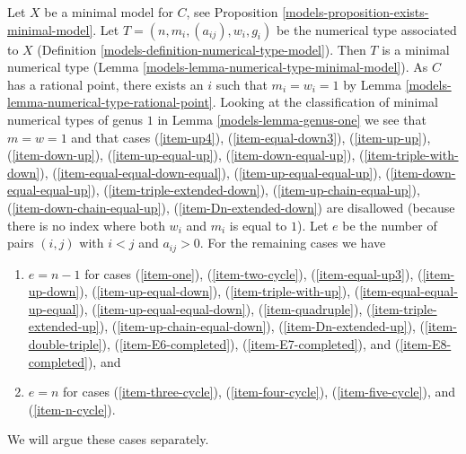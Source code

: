 \medskip\noindent
Let $X$ be a minimal model for $C$, see
Proposition \ref{models-proposition-exists-minimal-model}.
Let $T = (n, m_i, (a_{ij}), w_i, g_i)$
be the numerical type associated to $X$
(Definition \ref{models-definition-numerical-type-model}).
Then $T$ is a minimal numerical type
(Lemma \ref{models-lemma-numerical-type-minimal-model}).
As $C$ has a rational point, there exists an $i$
such that $m_i = w_i = 1$ by Lemma \ref{models-lemma-numerical-type-rational-point}.
Looking at the classification of minimal numerical types
of genus $1$ in Lemma \ref{models-lemma-genus-one}
we see that $m = w = 1$ and that cases
(\ref{item-up4}),
(\ref{item-equal-down3}),
(\ref{item-up-up}),
(\ref{item-down-up}),
(\ref{item-up-equal-up}),
(\ref{item-down-equal-up}),
(\ref{item-triple-with-down}),
(\ref{item-equal-equal-down-equal}),
(\ref{item-up-equal-equal-up}),
(\ref{item-down-equal-equal-up}),
(\ref{item-triple-extended-down}),
(\ref{item-up-chain-equal-up}),
(\ref{item-down-chain-equal-up}),
(\ref{item-Dn-extended-down}) are disallowed (because there is no
index where both $w_i$ and $m_i$ is equal to $1$).
Let $e$ be the number of pairs $(i, j)$ with $i < j$ and
$a_{ij} > 0$. For the remaining cases we have
\begin{enumerate}
\item[(A)] $e = n - 1$ for cases
(\ref{item-one}),
(\ref{item-two-cycle}),
(\ref{item-equal-up3}),
(\ref{item-up-down}),
(\ref{item-up-equal-down}),
(\ref{item-triple-with-up}),
(\ref{item-equal-equal-up-equal}),
(\ref{item-up-equal-equal-down}),
(\ref{item-quadruple}),
(\ref{item-triple-extended-up}),
(\ref{item-up-chain-equal-down}),
(\ref{item-Dn-extended-up}),
(\ref{item-double-triple}),
(\ref{item-E6-completed}),
(\ref{item-E7-completed}), and
(\ref{item-E8-completed}), and
\item[(B)] $e = n$ for cases
(\ref{item-three-cycle}),
(\ref{item-four-cycle}),
(\ref{item-five-cycle}), and
(\ref{item-n-cycle}).
\end{enumerate}
We will argue these cases separately.

